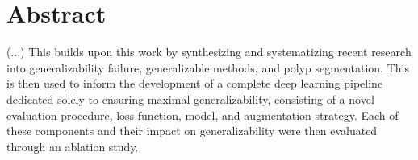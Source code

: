 \chapter*{Abstract}
    (...)
    This builds upon this work by synthesizing and systematizing recent research into generalizability failure, generalizable methods, and polyp segmentation. This is then used to inform the development of a complete deep learning pipeline dedicated solely to ensuring maximal generalizability, consisting of a novel evaluation procedure, loss-function, model, and augmentation strategy. Each of these components and their impact on generalizability were then evaluated through an ablation study.  